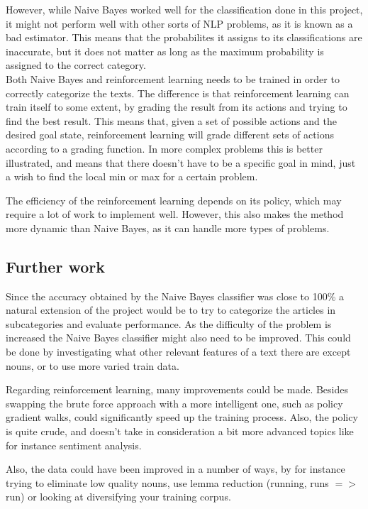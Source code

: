 \documentclass[a4paper,10pt]{article}
\begin{document}
\noindent However, while Naive Bayes worked well for the classification done in this project, it might not perform well with other sorts of NLP problems, as it is known as a bad estimator. This means that the probabilites it assigns to its classifications are inaccurate, but it does not matter as long as the maximum probability is assigned to the correct category\cite{NBestimation}.\\

\noindent Both Naive Bayes and reinforcement learning needs to be trained in order to correctly categorize the texts. The difference is that reinforcement learning can train itself to some extent, by grading the result from its actions and trying to find the best result. This means that, given a set of possible actions and the desired goal state, reinforcement learning will grade different sets of actions according to a grading function. In more complex problems this is better illustrated, and  means that there doesn't have to be a specific goal in mind, just a wish to find the local min or max for a certain problem.\cite{DogWalk} 

\noindent The efficiency of the reinforcement learning depends on its policy, which may require a lot of work to implement well. However, this also makes the method more dynamic than Naive Bayes, as it can handle more types of problems.

\subsection{Further work}
Since the accuracy obtained by the Naive Bayes classifier was close to 100\% a natural extension of the project would be to try to categorize the articles in subcategories and evaluate performance. As the difficulty of the problem is increased the Naive Bayes classifier might also need to be improved. This could be done by investigating what other relevant features of a text there are except nouns, or to use more varied train data. 

Regarding reinforcement learning, many improvements could be made. Besides swapping the brute force approach with a more intelligent one, such as policy gradient walks, could significantly speed up the training process. Also, the policy is quite crude, and doesn't take in consideration a bit more advanced topics like for instance sentiment analysis. 

Also, the data could have been improved in a number of ways, by for instance trying to eliminate low quality nouns, use lemma reduction (running, runs $=>$ run) or looking at diversifying your training corpus.
\end{document}
